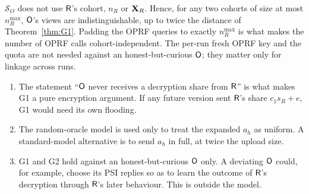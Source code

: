 \begin{corollary}\label{cor:G2}
$\mathcal S_O$ does not use $\mathsf{R}$'s cohort, $n_R$ or $\mathbf{X}_R$. Hence, for any two cohorts of size at most $n_R^{\max}$, $\mathsf{O}$'s views are indistinguishable, up to twice the distance of Theorem~\ref{thm:G1}. Padding the OPRF queries to exactly $n_R^{\max}$ is what makes the number of OPRF calls cohort-independent. The per-run fresh OPRF key and the quota are not needed against an honest-but-curious $\mathsf{O}$; they matter only for linkage across runs.
\end{corollary}

\begin{remark}
\begin{enumerate}[nosep,label=(\roman*)]
  \item The statement ``$\mathsf{O}$ never receives a decryption share from $\mathsf{R}$'' is what makes G1 a pure encryption argument. If any future version sent $\mathsf{R}$'s share $c_1s_R+e$, G1 would need its own flooding.
  \item The random-oracle model is used only to treat the expanded $a_h$ as uniform. A standard-model alternative is to send $a_h$ in full, at twice the upload size.
  \item G1 and G2 hold against an honest-but-curious $\mathsf{O}$ only. A deviating $\mathsf{O}$ could, for example, choose its PSI replies so as to learn the outcome of $\mathsf{R}$'s decryption through $\mathsf{R}$'s later behaviour. This is outside the model.
\end{enumerate}
\end{remark}
